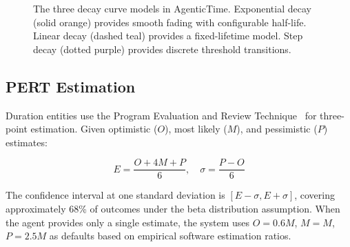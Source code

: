 \documentclass[10pt, twocolumn]{article}
\begin{document}
\begin{figure}[t]
\centering
{}
\caption{The three decay curve models in AgenticTime. Exponential decay (solid orange) provides smooth fading with configurable half-life. Linear decay (dashed teal) provides a fixed-lifetime model. Step decay (dotted purple) provides discrete threshold transitions.}
\label{fig:decay_curves}
\end{figure}


\subsection{PERT Estimation}
\label{sec:pert}

Duration entities use the Program Evaluation and Review Technique~\cite{pert1959} for three-point estimation. Given optimistic ($O$), most likely ($M$), and pessimistic ($P$) estimates:

\begin{equation}
E = \frac{O + 4M + P}{6}, \quad \sigma = \frac{P - O}{6}
\label{eq:pert}
\end{equation}

The confidence interval at one standard deviation is $[E - \sigma, E + \sigma]$, covering approximately 68\% of outcomes under the beta distribution assumption. When the agent provides only a single estimate, the system uses $O = 0.6M$, $M = M$, $P = 2.5M$ as defaults based on empirical software estimation ratios.
\end{document}

